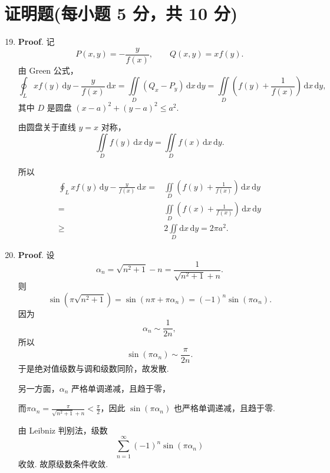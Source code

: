 \documentclass[../Main.tex]{subfiles}
\begin{document}
\section{证明题(每小题 5 分，共 10 分)}
\begin{enumerate}
  \setcounter{enumi}{18}
  \item \textbf{Proof}. 记
        \[
          P(x,y)=-\frac{y}{f(x)},\qquad Q(x,y)=xf(y).
        \]
        由 Green 公式，
        \[
          \oint_L xf(y)\,\mathrm{d}y-\frac{y}{f(x)}\,\mathrm{d}x
          =\iint\limits_D\left(Q_x-P_y\right)\,\mathrm{d}x\,\mathrm{d}y
          =\iint\limits_D\left(f(y)+\frac1{f(x)}\right)\,\mathrm{d}x\,\mathrm{d}y,
        \]
        其中 \(D\) 是圆盘 \((x-a)^2+(y-a)^2\le a^2\).

        由圆盘关于直线 \(y=x\) 对称，
        \[
          \iint\limits_D f(y)\,\mathrm{d}x\,\mathrm{d}y=\iint\limits_D f(x)\,\mathrm{d}x\,\mathrm{d}y.
        \]

        所以
        \[
          \begin{aligned}
            \oint_L xf(y)\,\mathrm{d}y-\frac{y}{f(x)}\,\mathrm{d}x
            =   & \iint\limits_D\left(f(y)+\frac1{f(x)}\right)\,\mathrm{d}x\,\mathrm{d}y \\
            =   & \iint\limits_D\left(f(x)+\frac1{f(x)}\right)\,\mathrm{d}x\,\mathrm{d}y \\
            \ge & 2\iint\limits_D \mathrm{d}x\,\mathrm{d}y=2\pi a^2.
          \end{aligned}
        \]

  \item \textbf{Proof}. 设
        \[
          \alpha_n=\sqrt{n^2+1}-n=\frac{1}{\sqrt{n^2+1}+n}.
        \]
        则
        \[
          \sin\left(\pi\sqrt{n^2+1}\right)
          =\sin(n\pi+\pi\alpha_n)=(-1)^n\sin(\pi\alpha_n).
        \]
        因为
        \[
          \alpha_n\sim\frac{1}{2n},
        \]
        所以
        \[
          \sin(\pi\alpha_n)\sim \frac{\pi}{2n}.
        \]
        于是绝对值级数与调和级数同阶，故发散.

        另一方面，\(\alpha_n\) 严格单调递减，且趋于零，

        而$\pi\alpha_n = \frac{\pi}{\sqrt{n^2+1}+n}<\frac{\pi}{2}$，因此 \(\sin(\pi\alpha_n)\) 也严格单调递减，且趋于零.

        由 Leibniz 判别法，级数
        \[
          \sum_{n=1}^{\infty}(-1)^n\sin(\pi\alpha_n)
        \]
        收敛. 故原级数条件收敛.
\end{enumerate}
\end{document}
